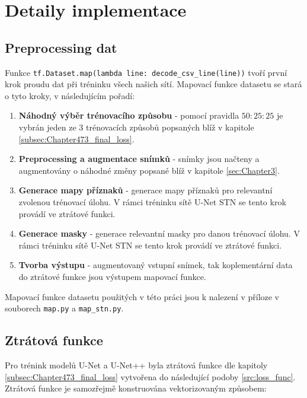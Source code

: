 \section{Detaily implementace}
\label{sec:Chapter55}

\subsection{Preprocessing dat}
Funkce \texttt{tf.Dataset.map(lambda line: decode\_csv\_line(line))} tvoří první krok proudu dat při tréninku všech našich sítí. Mapovací funkce datasetu se stará o tyto kroky, v následujícím pořadí:
\begin{enumerate}
    \item \textbf{Náhodný výběr trénovacího způsobu} - pomocí pravidla $50:25:25$ je vybrán jeden ze 3 trénovacích způsobů popsaných blíž v kapitole \ref{subsec:Chapter473_final_loss}.
    \item \textbf{Preprocessing a augmentace snímků} - snímky jsou načteny a augmentovány o náhodné změny popsané blíž v kapitole \ref{sec:Chapter3}.
    \item \textbf{Generace mapy příznaků} - generace mapy příznaků pro relevantní zvolenou trénovací úlohu. V rámci tréninku sítě U-Net STN se tento krok provádí ve ztrátové funkci.
    \item \textbf{Generace masky} - generace relevantní masky pro danou trénovací úlohu. V rámci tréninku sítě U-Net STN se tento krok provádí ve ztrátové funkci.
    \item \textbf{Tvorba výstupu} - augmentovaný vstupní snímek, tak koplementární data do ztrátové funkce jsou výstupem mapovací funkce.
\end{enumerate}

Mapovací funkce datasetu použitých v této práci jsou k nalezení v příloze v souborech \texttt{map.py} a \texttt{map\_stn.py}.



\subsection{Ztrátová funkce}
\label{subsec:Chapter55_loss_func}

Pro trénink modelů U-Net a U-Net++ byla ztrátová funkce dle kapitoly \ref{subsec:Chapter473_final_loss} vytvořena do následující podoby \ref{src:loss_func}. Ztrátová funkce je samozřejmě konstruována vektorizovaným způsobem:

\label{src:loss_func}



